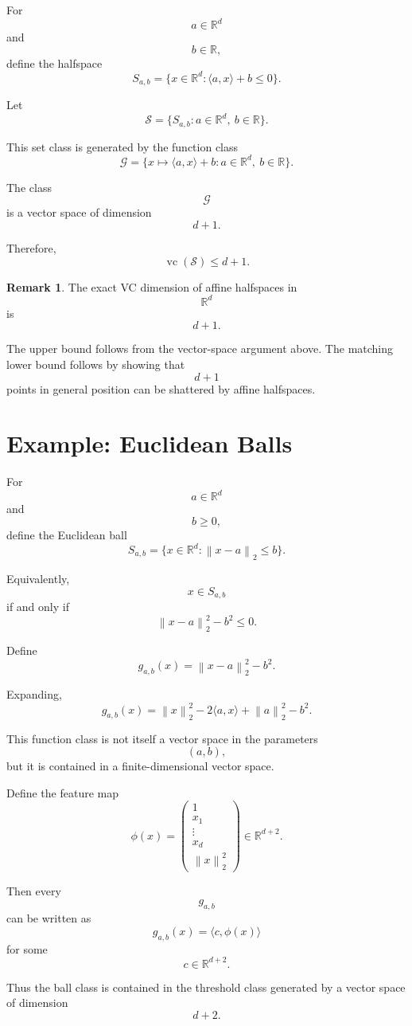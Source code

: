 \documentclass[12pt,oneside]{book}
\numberwithin{equation}{section}
\theoremstyle{definition}
\newtheorem{remark}{Remark}[section]
\theoremstyle{plain}
\theoremstyle{remark}
\newcommand{\R}{\mathbb{R}}
\newcommand{\norm}[1]{\left\lVert #1 \right\rVert}
\begin{document}
For
\[
a\in\R^d
\]
and
\[
b\in\R,
\]
define the halfspace
\[
S_{a,b}
=
\{x\in\R^d:\langle a,x\rangle+b\leq0\}.
\]

Let
\[
\mathcal{S}
=
\{S_{a,b}:a\in\R^d,\ b\in\R\}.
\]

This set class is generated by the function class
\[
\mathcal{G}
=
\{x\mapsto \langle a,x\rangle+b:a\in\R^d,\ b\in\R\}.
\]

The class
\[
\mathcal{G}
\]
is a vector space of dimension
\[
d+1.
\]

Therefore,
\[
\operatorname{vc}(\mathcal{S})
\leq
d+1.
\]

\begin{remark}
The exact VC dimension of affine halfspaces in
\[
\R^d
\]
is
\[
d+1.
\]

The upper bound follows from the vector-space argument above. The matching lower bound follows by showing that
\[
d+1
\]
points in general position can be shattered by affine halfspaces.
\end{remark}

\section{Example: Euclidean Balls}

For
\[
a\in\R^d
\]
and
\[
b\geq0,
\]
define the Euclidean ball
\[
S_{a,b}
=
\{x\in\R^d:\norm{x-a}_2\leq b\}.
\]

Equivalently,
\[
x\in S_{a,b}
\]
if and only if
\[
\norm{x-a}_2^2-b^2\leq0.
\]

Define
\[
g_{a,b}(x)
=
\norm{x-a}_2^2-b^2.
\]

Expanding,
\[
g_{a,b}(x)
=
\norm{x}_2^2
-
2\langle a,x\rangle
+
\norm{a}_2^2
-
b^2.
\]

This function class is not itself a vector space in the parameters
\[
(a,b),
\]
but it is contained in a finite-dimensional vector space.

Define the feature map
\[
\phi(x)
=
\begin{pmatrix}
1\\
x_1\\
\vdots\\
x_d\\
\norm{x}_2^2
\end{pmatrix}
\in\R^{d+2}.
\]

Then every
\[
g_{a,b}
\]
can be written as
\[
g_{a,b}(x)
=
\langle c,\phi(x)\rangle
\]
for some
\[
c\in\R^{d+2}.
\]

Thus the ball class is contained in the threshold class generated by a vector space of dimension
\[
d+2.
\]
\end{document}
